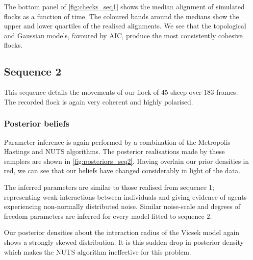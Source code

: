 The bottom panel of \cref{fig:checks_seq1} shows the median alignment of
simulated flocks as a function of time. The coloured bands around the medians
show the upper and lower quartiles of the realised alignments. We see that the
topological and Gaussian models, favoured by AIC, produce the most consistently
cohesive flocks.

\subsection{Sequence 2}

This sequence details the movements of our flock of 45 sheep over 183
frames. The recorded flock is again very coherent and highly polarised. 

\subsubsection{Posterior beliefs}

Parameter inference is again performed by a combination of the Metropolis--Hastings
and NUTS algorithms. The posterior realisations made by these samplers are shown
in \cref{fig:posteriors_seq2}. Having overlain our prior densities in red,
we can see that our beliefs have changed considerably in light of the data.

The inferred parameters are similar to those realised from sequence 1;
representing weak interactions between individuals and giving evidence of
agents experiencing non-normally distributed noise. Similar noise-scale and
degrees of freedom parameters are inferred for every model fitted to sequence
2.

Our posterior densities about the interaction radius of the Vicsek model again
shows a strongly skewed distribution. It is this sudden drop in posterior
density which makes the NUTS algorithm ineffective for this problem.

